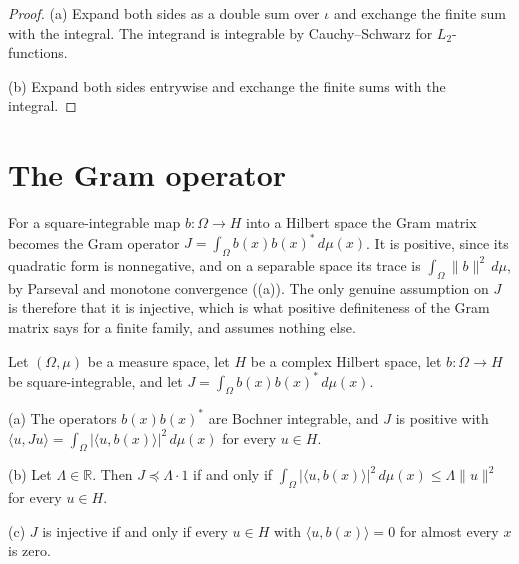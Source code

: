 \begin{proof}
\leanok
(a) Expand both sides as a double sum over $\iota$ and exchange the finite sum with the
integral. The integrand is integrable by Cauchy--Schwarz for $L_2$-functions.

(b) Expand both sides entrywise and exchange the finite sums with the integral.
\end{proof}

\section{The Gram operator}

For a square-integrable map $b : \Omega \to H$ into a Hilbert space the Gram matrix becomes
the Gram operator $J = \int_\Omega b(x) b(x)^* \, d\mu(x)$. It is positive, since its
quadratic form is nonnegative, and on a separable space its trace is
$\int_\Omega \|b\|^2 \, d\mu$, by Parseval and monotone convergence
((a)). The only genuine assumption on $J$ is therefore that it is
injective, which is what positive definiteness of the Gram matrix says for a finite family,
and  assumes nothing else.

\begin{lemma}
\label{lem:gram-operator}
\leanok
Let $(\Omega, \mu)$ be a measure space, let $H$ be a complex Hilbert space, let
$b : \Omega \to H$ be square-integrable, and let $J = \int_\Omega b(x) b(x)^* \, d\mu(x)$.

(a) The operators $b(x) b(x)^*$ are Bochner integrable, and $J$ is positive with
$\langle u, J u \rangle = \int_\Omega |\langle u, b(x) \rangle|^2 \, d\mu(x)$ for every
$u \in H$.

(b) Let $\Lambda \in \mathbb{R}$. Then $J \preceq \Lambda \cdot 1$ if and only if
$\int_\Omega |\langle u, b(x) \rangle|^2 \, d\mu(x) \leq \Lambda \|u\|^2$ for every
$u \in H$.

(c) $J$ is injective if and only if every $u \in H$ with $\langle u, b(x) \rangle = 0$ for
almost every $x$ is zero.
\end{lemma}

